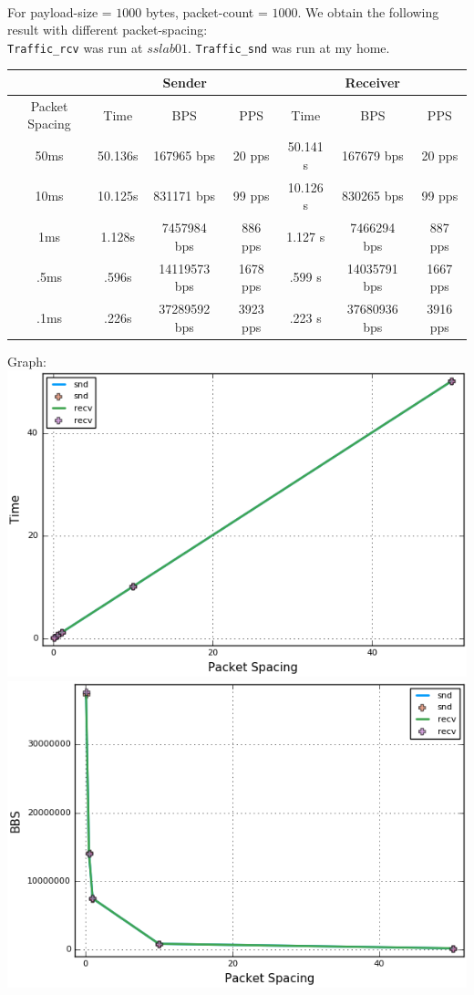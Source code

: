 \documentclass[12pt]{article}
\newenvironment{problem}[2][Problem]{\begin{trivlist}
\item[\hskip \labelsep {\bfseries #1}\hskip \labelsep {\bfseries #2.}]}{\end{trivlist}}
\begin{document}
\begin{problem}{2} \ \\
For payload-size = $1000$ bytes, packet-count = $1000$. We obtain the following result with different packet-spacing:\\
\texttt{Traffic\_rcv} was run at $sslab01$. \texttt{Traffic\_snd} was run at my home. 
\begin{center}
	\begin{tabular}{|c|c|c|c|c|c|c|}
	\hline 
	& \multicolumn{3}{|c|}{Sender} & \multicolumn{3}{|c|}{Receiver}\\ \hline
	Packet Spacing 		   & Time& BPS& PPS& Time &BPS& PPS\\ \hline
	50ms 		  		   & 50.136s &  167965 bps& 20 pps & 50.141 s &167679 bps&20 pps\\ \hline
	10ms 		  		   & 10.125s &  831171 bps& 99 pps & 10.126 s &830265 bps&99 pps\\ \hline
	1ms 		  		   & 1.128s &  7457984 bps& 886 pps & 1.127 s &7466294 bps& 887 pps\\ \hline
	.5ms 		  		   & .596s &  14119573 bps& 1678 pps & .599 s &14035791 bps&1667 pps\\ \hline
	.1ms 		  		   & .226s &  37289592 bps& 3923 pps & .223 s &37680936 bps&3916 pps\\ \hline
	\end{tabular}
\end{center}
Graph: \\
\includegraphics[scale=.6]{3.png}
\includegraphics[scale=.6]{4.png}\\

\end{problem}
\end{document}
